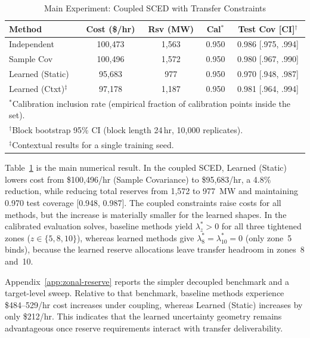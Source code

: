 \documentclass[11pt]{article}
\theoremstyle{definition}
\begin{document}
\begin{table}[!t]
\caption{Main Experiment: Coupled SCED with Transfer Constraints}
\label{tab:coupled}
\centering\footnotesize\setlength{\tabcolsep}{4pt}
\begin{tabular}{lcccc}
\toprule
\textbf{Method} & \textbf{Cost (\$/hr)} & \textbf{Rsv (MW)} & \textbf{Cal$^*$} & \textbf{Test Cov [CI]$^\dagger$} \\
\midrule
Independent & 100{,}473 & 1{,}563 & 0.950 & 0.986 [.975, .994] \\
Sample Cov & 100{,}496 & 1{,}572 & 0.950 & 0.980 [.967, .990] \\
Learned (Static) & 95{,}683 & 977 & 0.950 & 0.970 [.948, .987] \\
Learned (Ctxt)$^\ddagger$ & 97{,}178 & 1{,}187 & 0.950 & 0.981 [.964, .994] \\
\bottomrule
\multicolumn{5}{l}{\footnotesize $^*$Calibration inclusion rate (empirical fraction of calibration points inside the set).} \\
\multicolumn{5}{l}{\footnotesize $^\dagger$Block bootstrap 95\% CI (block length 24\,hr, 10{,}000 replicates).} \\
\multicolumn{5}{l}{\footnotesize $^\ddagger$Contextual results for a single training seed.}
\end{tabular}
\end{table}

Table~\ref{tab:coupled} is the main numerical result. In the coupled SCED, Learned (Static) lowers cost from \$100{,}496/hr (Sample Covariance) to \$95{,}683/hr, a 4.8\% reduction, while reducing total reserves from 1{,}572 to 977~MW and maintaining 0.970 test coverage [0.948, 0.987]. The coupled constraints raise costs for all methods, but the increase is materially smaller for the learned shapes. In the calibrated evaluation solves, baseline methods yield $\lambda_z^* > 0$ for all three tightened zones ($z \in \{5, 8, 10\}$), whereas learned methods give $\lambda_8^* = \lambda_{10}^* = 0$ (only zone~5 binds), because the learned reserve allocations leave transfer headroom in zones~8 and~10.

Appendix~\ref{app:zonal-reserve} reports the simpler decoupled benchmark and a target-level sweep. Relative to that benchmark, baseline methods experience \$484--529/hr cost increases under coupling, whereas Learned (Static) increases by only \$212/hr. This indicates that the learned uncertainty geometry remains advantageous once reserve requirements interact with transfer deliverability.
\end{document}
